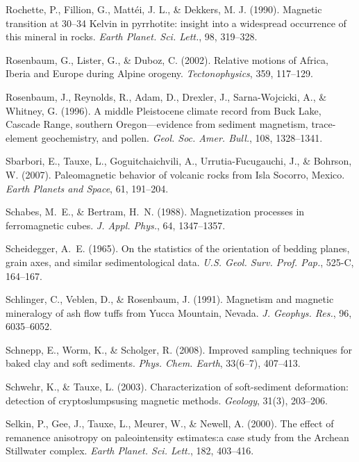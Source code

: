 \documentclass[,plain]{tauxe}
\begin{document}
\begin{thebibliography}{}
\bibitem{}%
Rochette, P., Fillion, G., Matt{\'{e}}i, J. L., \& Dekkers, M.
J. (1990). Magnetic transition at 30--34 Kelvin in pyrrhotite:
insight into a widespread occurrence of this mineral in rocks. {\it
Earth Planet. Sci. Lett.}, 98, 319--328.

\bibitem{}%
Rosenbaum, G., Lister, G., \& Duboz, C. (2002).
Relative motions of Africa, Iberia and Europe during Alpine orogeny.
{\it Tectonophysics}, 359, 117--129.

\bibitem{}%
Rosenbaum, J., Reynolds, R., Adam, D., Drexler, J., Sarna-Wojcicki, A., \& Whitney, G. (1996).
A middle Pleistocene climate record from Buck Lake, Cascade Range, southern Oregon---evidence from sediment magnetism, trace-element geochemistry, and pollen.
{\it Geol. Soc. Amer. Bull.}, 108, 1328--1341.

\bibitem{}%
Sbarbori, E., Tauxe, L., Goguitchaichvili, A., Urrutia-Fucugauchi,
J., \& Bohrson, W.  (2007).
Paleomagnetic behavior of volcanic rocks from Isla Socorro, Mexico.
{\it Earth Planets and Space}, 61, 191--204.

\bibitem{}%
Schabes, M.~E., \& Bertram, H.~N. (1988).
Magnetization processes in ferromagnetic cubes.
{\it J. Appl. Phys.}, 64, 1347--1357.

\bibitem{}%
Scheidegger, A.~E. (1965).
On the statistics of the orientation of bedding planes, grain axes, and similar sedimentological data.
{\it U.S. Geol. Surv. Prof. Pap.}, 525-C, 164--167.

\bibitem{}%
Schlinger, C., Veblen, D., \& Rosenbaum, J. (1991).
Magnetism and magnetic mineralogy of ash flow tuffs from Yucca Mountain, Nevada.
{\it J. Geophys. Res.}, 96, 6035--6052.

\bibitem{}%
Schnepp, E., Worm, K., \& Scholger, R. (2008).
Improved sampling techniques for baked clay and soft sediments.
{\it Phys. Chem. Earth}, 33(6--7), 407--413.

\bibitem{}%
Schwehr, K., \& Tauxe, L. (2003).
Characterization of soft-sediment deformation: detection of cryptoslumps\break using magnetic methods.
{\it Geology}, 31(3), 203--206.

\bibitem{}%
Selkin, P., Gee, J., Tauxe, L., Meurer, W., \& Newell, A. (2000).
The effect of remanence anisotropy on paleointensity estimates:\break a case study from the Archean Stillwater complex.
{\it Earth Planet. Sci. Lett.}, 182, 403--416.


\end{thebibliography}
\end{document}
